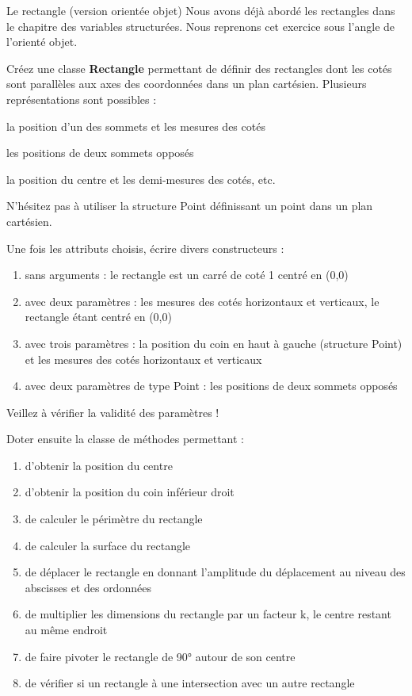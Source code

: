 \begin{Exercice}{Le rectangle (version orientée objet)}
	Nous avons déjà abordé les rectangles dans le chapitre des variables
	structurées. Nous reprenons cet exercice sous l’angle de l’orienté
	objet.

	Créez une classe \textbf{Rectangle}
	permettant de définir des rectangles dont les cotés sont parallèles aux
	axes des coordonnées dans un plan cartésien. Plusieurs représentations
	sont possibles :

	\begin{liste}
		\item 
			la position d’un des sommets et les mesures des cotés
		\item 
			les positions de deux sommets opposés
		\item 
			la position du centre et les demi-mesures des cotés, etc.
	\end{liste}

	N’hésitez pas à utiliser la structure Point définissant un point dans un
	plan cartésien.

	Une fois les attributs choisis, écrire divers constructeurs :

	\begin{enumerate}[label=\alph*)]
		\item 
			sans arguments : le rectangle est un carré de coté 1 centré en (0,0)
		\item
			avec deux paramètres : les mesures des cotés horizontaux et verticaux,
			le rectangle étant centré en (0,0)
		\item 
			avec trois paramètres : la position du coin en haut à gauche (structure
			Point) et les mesures des cotés horizontaux et verticaux 
		\item 
			avec deux paramètres de type Point : les positions de deux sommets
			opposés
	\end{enumerate}

	Veillez à vérifier la validité des paramètres !

	Doter ensuite la classe de méthodes permettant :

	\begin{enumerate}[label=\alph*)]
		\item 
			d’obtenir la position du centre
		\item 
			d’obtenir la position du coin inférieur droit
		\item 
			de calculer le périmètre du rectangle
		\item 
			de calculer la surface du rectangle
		\item 
			de déplacer le rectangle en donnant l’amplitude du déplacement au niveau
			des abscisses et des ordonnées
		\item 
			de multiplier les dimensions du rectangle par un facteur k, le centre
			restant au même endroit
		\item 
			de faire pivoter le rectangle de 90° autour de son centre
		\item 
			de vérifier si un rectangle à une intersection avec un autre rectangle
	\end{enumerate}


\end{Exercice}
